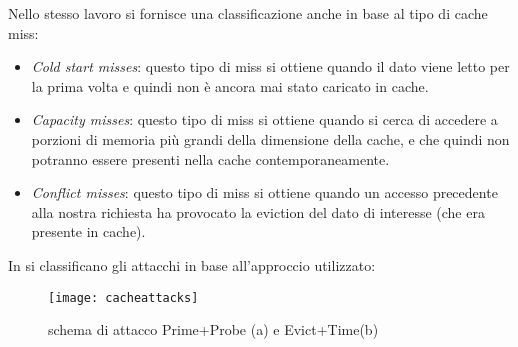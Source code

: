 			Nello stesso lavoro si fornisce una classificazione anche in base al tipo di cache miss:
			
			\begin{itemize}
				\item \emph{Cold start misses}: questo tipo di miss si ottiene quando il dato viene letto per la prima volta e quindi non è ancora mai stato caricato in cache.
				\item \emph{Capacity misses}: questo tipo di miss si ottiene quando si cerca di accedere a porzioni di memoria più grandi della dimensione della cache, e che quindi non potranno essere presenti nella cache contemporaneamente.
				\item \emph{Conflict misses}: questo tipo di miss si ottiene quando un accesso precedente alla nostra richiesta ha provocato la eviction del dato di interesse (che era presente in cache).
			\end{itemize}
			
			In \cite{lipp2016armageddon,ge2016survey} si classificano gli attacchi in base all'approccio utilizzato:
			
			\begin{figure}
				\begin{center}
					\texttt{[image: cacheattacks]}
					\caption{schema di attacco Prime+Probe (a) e Evict+Time(b)}
					\label{fig:cacheattacks}
				\end{center}
			\end{figure}
			

